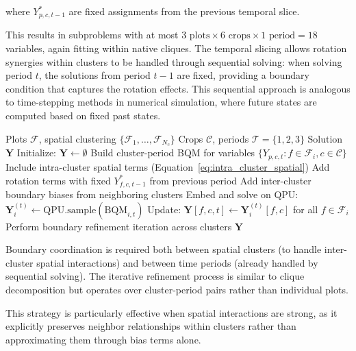 \documentclass{oqireport}
\begin{document}
where $Y_{p,c,t-1}^*$ are fixed assignments from the previous temporal slice.

This results in subproblems with at most $3 \text{ plots} \times 6 \text{ crops} \times 1 \text{ period} = 18$ variables, again fitting within native cliques. The temporal slicing allows rotation synergies within clusters to be handled through sequential solving: when solving period $t$, the solutions from period $t-1$ are fixed, providing a boundary condition that captures the rotation effects. This sequential approach is analogous to time-stepping methods in numerical simulation, where future states are computed based on fixed past states.

\begin{algorithm}
\caption{Spatial-Temporal Decomposition}
\begin{algorithmic}[1]
\Require Plots $\mathcal{F}$, spatial clustering $\{\mathcal{F}_1, \ldots, \mathcal{F}_{N_c}\}$
\Require Crops $\mathcal{C}$, periods $\mathcal{T} = \{1,2,3\}$
\Ensure Solution $\mathbf{Y}$
\State Initialize: $\mathbf{Y} \leftarrow \emptyset$
        \State Build cluster-period BQM for variables $\{Y_{p,c,t} : f \in \mathcal{F}_i, c \in \mathcal{C}\}$
        \State Include intra-cluster spatial terms (Equation~\ref{eq:intra_cluster_spatial})
            \State Add rotation terms with fixed $Y_{f,c,t-1}^*$ from previous period
        \EndIf
        \State Add inter-cluster boundary biases from neighboring clusters
        \State Embed and solve on QPU: $\mathbf{Y}_i^{(t)} \leftarrow \text{QPU.sample}(\text{BQM}_{i,t})$
        \State Update: $\mathbf{Y}[f,c,t] \leftarrow \mathbf{Y}_i^{(t)}[f,c]$ for all $f \in \mathcal{F}_i$
    \EndFor
    \State Perform boundary refinement iteration across clusters
\EndFor
\State \Return $\mathbf{Y}$
\end{algorithmic}
\end{algorithm}

Boundary coordination is required both between spatial clusters (to handle inter-cluster spatial interactions) and between time periods (already handled by sequential solving). The iterative refinement process is similar to clique decomposition but operates over cluster-period pairs rather than individual plots.

This strategy is particularly effective when spatial interactions are strong, as it explicitly preserves neighbor relationships within clusters rather than approximating them through bias terms alone.
\end{document}
